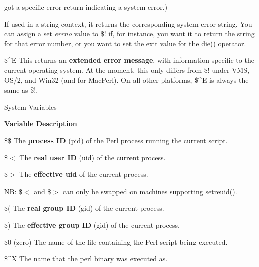 \documentclass[a4paper,11pt]{book}
\begin{document}
\noindent got a specific error return indicating a system error.)

\noindent 

\noindent If used in a string context, it returns the corresponding system error string. You can assign a set \textit{errno }value to \$! if, for instance, you want it to return the string for that error number, or you want to set the exit value for the die() operator.

\noindent 

\noindent \$\^{}E This returns an \textbf{extended error message}, with information specific to the current operating system. At the moment, this only differs from \$! under VMS, OS/2, and Win32 (and for MacPerl). On all other platforms, \$\^{}E is always the same as \$!.

\noindent 

\noindent 

\noindent 

\noindent System Variables

\noindent 

\noindent \textbf{Variable Description}

\noindent 

\noindent \$\$ The \textbf{process ID }(pid) of the Perl process running the current script.

\noindent 

\noindent \$$<$ The \textbf{real user ID }(uid) of the current process.

\noindent 

\noindent \$$>$ The \textbf{effective uid }of the current process.

\noindent 

\noindent NB: \$$<$ and \$$>$ can only be swapped on machines supporting setreuid().

\noindent 

\noindent \$( The \textbf{real group ID }(gid) of the current process.

\noindent 

\noindent \$) The \textbf{effective group ID }(gid) of the current process.

\noindent 

\noindent \$0 (zero) The name of the file containing the Perl script being executed.

\noindent 

\noindent \$\^{}X The name that the perl binary was executed as.

\noindent 
\end{document}
